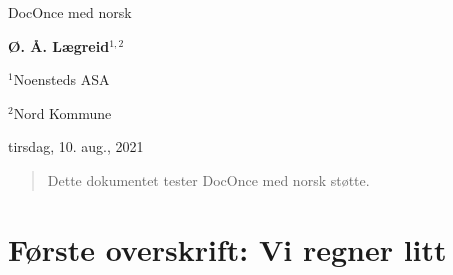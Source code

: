 \documentclass[%
norsk,oneside,                 %
final,                   %
10pt]{article}
\begin{document}

\newcommand{\exercisesection}[1]{\subsection*{#1}}








\thispagestyle{empty}

\begin{center}
{\LARGE\bf
\begin{spacing}{1.25}
DocOnce med norsk
\end{spacing}
}
\end{center}


\begin{center}
{\bf Ø. Å. Lægreid${}^{1, 2}$} \\ [0mm]
\end{center}

\begin{center}
\centerline{{\small ${}^1$Noensteds ASA}}
\centerline{{\small ${}^2$Nord Kommune}}
\end{center}
    

\begin{center}
tirsdag, 10. aug., 2021
\end{center}

\vspace{1cm}



\begin{abstract}
Dette dokumentet tester DocOnce med norsk støtte.
\end{abstract}

\tableofcontents

\vspace{1cm} %

\section{Første overskrift: Vi regner litt}
\end{document}
